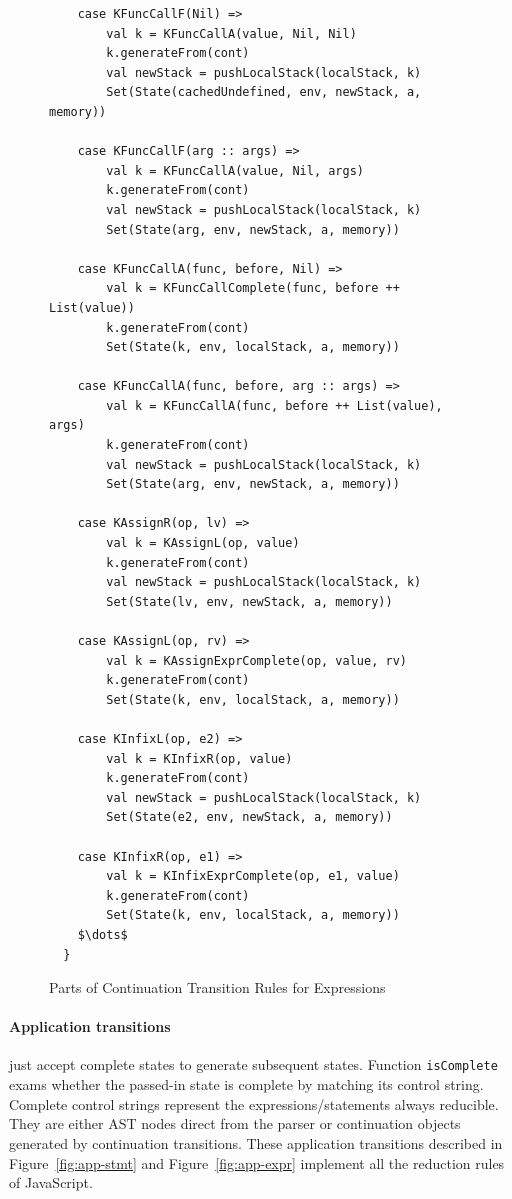\documentclass{article}
\begin{document}
\begin{figure}
\lstset{language=Scala, mathescape}
\begin{lstlisting}
    case KFuncCallF(Nil) =>
        val k = KFuncCallA(value, Nil, Nil)
        k.generateFrom(cont)
        val newStack = pushLocalStack(localStack, k)
        Set(State(cachedUndefined, env, newStack, a, memory))

    case KFuncCallF(arg :: args) =>
        val k = KFuncCallA(value, Nil, args)
        k.generateFrom(cont)
        val newStack = pushLocalStack(localStack, k)
        Set(State(arg, env, newStack, a, memory))

    case KFuncCallA(func, before, Nil) =>
        val k = KFuncCallComplete(func, before ++ List(value))
        k.generateFrom(cont)
        Set(State(k, env, localStack, a, memory))

    case KFuncCallA(func, before, arg :: args) =>
        val k = KFuncCallA(func, before ++ List(value), args)
        k.generateFrom(cont)
        val newStack = pushLocalStack(localStack, k)
        Set(State(arg, env, newStack, a, memory))

    case KAssignR(op, lv) =>
        val k = KAssignL(op, value)
        k.generateFrom(cont)
        val newStack = pushLocalStack(localStack, k)
        Set(State(lv, env, newStack, a, memory))

    case KAssignL(op, rv) =>
        val k = KAssignExprComplete(op, value, rv)
        k.generateFrom(cont)
        Set(State(k, env, localStack, a, memory))

    case KInfixL(op, e2) =>
        val k = KInfixR(op, value)
        k.generateFrom(cont)
        val newStack = pushLocalStack(localStack, k)
        Set(State(e2, env, newStack, a, memory))

    case KInfixR(op, e1) =>
        val k = KInfixExprComplete(op, e1, value)
        k.generateFrom(cont)
        Set(State(k, env, localStack, a, memory))
    $\dots$
  }
\end{lstlisting}
\caption{Parts of Continuation Transition Rules for Expressions}
\label{fig:cont-expr}
\end{figure}

\paragraph{Application transitions}just accept complete states to generate subsequent states. Function \verb|isComplete| exams whether the passed-in state is complete by matching its control string.
Complete control strings represent the expressions/statements always reducible.
They are either AST nodes direct from the parser or continuation objects generated by continuation transitions. These application transitions described in Figure~\ref{fig:app-stmt} and Figure~\ref{fig:app-expr} implement all the reduction rules of JavaScript.
\end{document}
